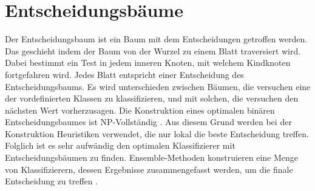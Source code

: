 \chapter{Entscheidungsbäume}
Der Entscheidungsbaum ist ein Baum mit dem Entscheidungen getroffen werden. Das geschieht indem der Baum von der Wurzel zu einem Blatt traversiert wird. Dabei bestimmt ein Test in jedem inneren Knoten,
mit welchem Kindknoten fortgefahren wird. Jedes Blatt entspricht einer Entscheidung des Entscheidungsbaums. Es wird unterschieden zwischen Bäumen, die versuchen eine der vordefinierten Klassen zu klassifizieren,
und mit solchen, die versuchen den nächsten Wert vorherzusagen.
\newline
\newline
Die Konstruktion eines optimalen binären Entscheidungsbaumes ist NP-Vollständig \cite{laurent1976constructing}. Aus diesem Grund werden bei der Konstruktion
Heuristiken verwendet, die nur lokal die beste Entscheidung treffen. Folglich ist es sehr aufwändig den optimalen Klassifizierer mit Entscheidungsbäumen zu finden. Ensemble-Methoden konstruieren eine Menge von
Klassifizierern, dessen Ergebnisse zusammengefasst werden, um die finale Entscheidung zu treffen \cite{dietterich2002ensemble}.



